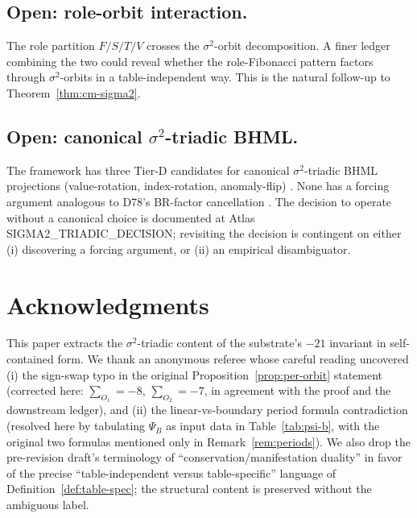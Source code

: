 \documentclass[11pt,reqno]{amsart}
\theoremstyle{plain}
\theoremstyle{definition}
\theoremstyle{remark}
\newcommand{\sig}{\sigma}
\begin{document}
\subsection{Open: role-orbit interaction.}
The role partition $F/S/T/V$ crosses the $\sig^{2}$-orbit
decomposition.  A finer ledger combining the two could reveal whether
the role-Fibonacci pattern factors through $\sig^{2}$-orbits in a
table-independent way.  This is the natural follow-up to
Theorem~\ref{thm:cm-sigma2}.

\subsection{Open: canonical $\sig^{2}$-triadic BHML.}
The framework has three Tier-D candidates for canonical
$\sig^{2}$-triadic BHML projections (value-rotation, index-rotation,
anomaly-flip) \cite{Atlas2026Tiering}.  None has a forcing argument
analogous to D78's BR-factor cancellation \cite{SandersGishFourCore}.
The decision to operate without a canonical choice is documented at
\cite{Atlas2026Tiering} Atlas SIGMA2\_TRIADIC\_DECISION; revisiting the
decision is contingent on either (i) discovering a forcing argument,
or (ii) an empirical disambiguator.

\section*{Acknowledgments}

This paper extracts the $\sig^{2}$-triadic content of the substrate's
$-21$ invariant in self-contained form.
We thank an anonymous referee whose careful reading uncovered
(i) the sign-swap typo in the original Proposition~\ref{prop:per-orbit}
statement (corrected here: $\sum_{O_1} = -8$, $\sum_{O_2} = -7$, in
agreement with the proof and the downstream ledger), and
(ii) the linear-vs-boundary period formula contradiction (resolved
here by tabulating $\Psi_B$ as input data in Table~\ref{tab:psi-b},
with the original two formulas mentioned only in Remark~\ref{rem:periods}).
We also drop the pre-revision draft's terminology of
``conservation/manifestation duality'' in favor of the precise
``table-independent versus table-specific'' language of
Definition~\ref{def:table-spec}; the structural content is preserved
without the ambiguous label.
\end{document}
